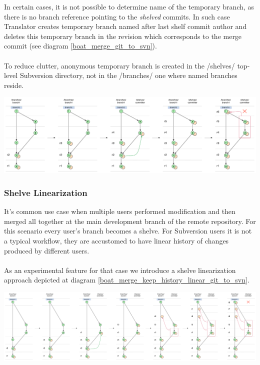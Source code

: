 In certain cases, it is not possible to determine name of the temporary branch, as there is no branch reference pointing to
the \emph{shelved} commits. In such case Translator creates temporary branch named after last shelf commit author and 
deletes this temporary branch in the revision which corresponds to the merge commit (see diagram \ref{boat_merge_git_to_svn}). 
\\\\
To reduce clutter, anonymous temporary branch is created in the /shelves/ top-level Subversion directory, not in the /branches/ one where named branches reside.

\begin{center}
\includegraphics[width=\textwidth]{img/diagrams/boat_merge_git_to_svn.pdf}%
\label{boat_merge_git_to_svn}%
\end{center}

\subsubsection{Shelve Linearization}

It's common use case when multiple users performed modification and then merged all together at the main development branch of the remote repository. For this scenario every user's branch becomes a shelve. For Subversion users it is not a typical workflow, they are accustomed to have linear history of changes produced by different users.
\\\\
As an experimental feature for that case we introduce a shelve linearization approach depicted at diagram \ref{boat_merge_keep_history_linear_git_to_svn}.
\begin{center}
\includegraphics[width=\textwidth]{img/diagrams/boat_merge_keep_history_linear_git_to_svn.pdf}%
\label{boat_merge_keep_history_linear_git_to_svn}%
\end{center}

